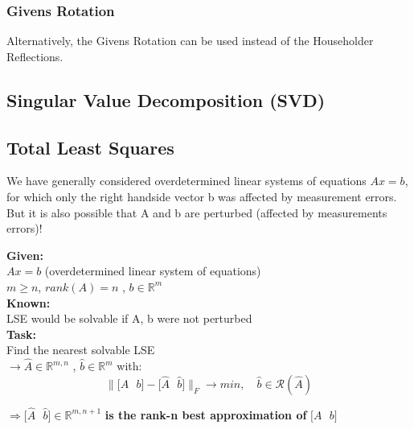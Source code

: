 \documentclass[12pt, a4paper]{article}
\newcommand{\R}{\mathbb{R}}
\begin{document}
\subsubsection{Givens Rotation}

Alternatively, the Givens Rotation can be used instead of the Householder Reflections. 
 
\subsection{Singular Value Decomposition (SVD)}




\subsection{Total Least Squares}
We have generally considered overdetermined linear systems of equations $Ax = b$, for which only the right handside vector b was affected by measurement errors. But it is also possible that A and b are perturbed (affected by measurements errors)!

\begin{tcolorbox}
\textbf{Given:}\\
$Ax = b$ (overdetermined linear system of equations) \\
$m \geq n$, $rank(A)=n$ ,  $b \in \R^{m}$\vspace{2mm}\\
\textbf{Known:}  \\
LSE would be solvable if A, b were not perturbed  \vspace{2mm}\\
\textbf{Task:} \\
Find the nearest solvable LSE \\
$\rightarrow  \hat A \in \R^{m,n}$ ,  $\hat b \in \R^{m}$ with: \\
\[ \lVert \lbrack A \text{ }b \rbrack - \lbrack \hat A \text{ } \hat b \rbrack\rVert_{F} \rightarrow min, \quad \hat b \in \mathcal{R}(\hat A) \] 
\end{tcolorbox}


$\Rightarrow \lbrack \hat A \text{ } \hat b \rbrack \in \R^{m, n+1}$ \textbf{is the rank-n best approximation of}  $\lbrack A \text{ }b \rbrack$ \\
\end{document}
